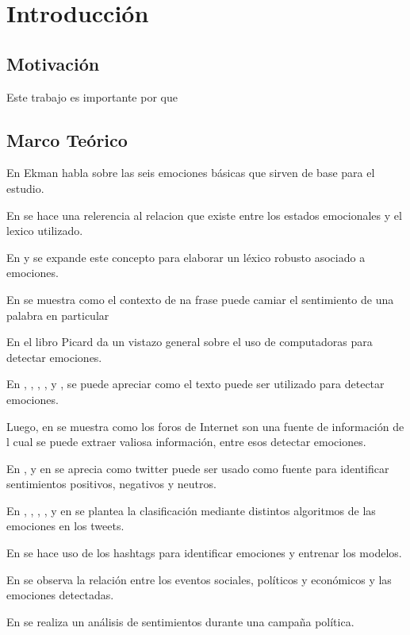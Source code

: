 \chapter{Introducción}






\section{Motivación}

Este trabajo es importante por que 



\section{Marco Teórico}

En \cite{ekman1993facial} Ekman habla sobre las seis emociones básicas que sirven de base para el estudio.

En \cite{ortony1987referential} se hace una relerencia al relacion que existe entre los estados emocionales y el lexico utilizado.

En \cite{strapparava2004wordnet} y \cite{esuli2006sentiwordnet} se expande este concepto para elaborar un léxico robusto asociado a emociones.

En \cite{wilson2009recognizing} se muestra como el contexto de na frase puede camiar el sentimiento de una palabra en particular

En el libro \cite{picard2000affective} Picard da un vistazo general sobre el uso de computadoras para detectar emociones.

En \cite{pang2002thumbs}, \cite{pang2004sentimental}, \cite{dave2003mining}, \cite{wilson2005recognizing}, \cite{alm2005emotions} y \cite{aman2007identifying}, \cite{wiebe2005annotating} se puede apreciar como el texto puede ser utilizado para detectar emociones.

Luego, en \cite{pang2008opinion} se muestra como los foros de Internet son una fuente de información de l cual se puede extraer valiosa información, entre esos detectar emociones.

En \cite{pak2010twitter}, \cite{kouloumpis2011twitter} y en \cite{go2009twitter} se aprecia como twitter puede ser usado como fuente para identificar sentimientos positivos, negativos y neutros.


En \cite{hasan2014emotex}, , \cite{strapparava2008learning}, \cite{strapparava2007semeval}, \cite{wang2012harnessing}y en \cite{roberts2012empatweet} se plantea la clasificación mediante distintos algoritmos de las emociones en los tweets.

En \cite{mohammad2012emotional} se hace uso de los hashtags para identificar emociones y entrenar los modelos.

En \cite{bollen2011modeling} se observa la relación entre los eventos sociales, políticos y económicos y las emociones detectadas.

En \cite{tumasjan2010predicting} se realiza un análisis de sentimientos durante una campaña política.






